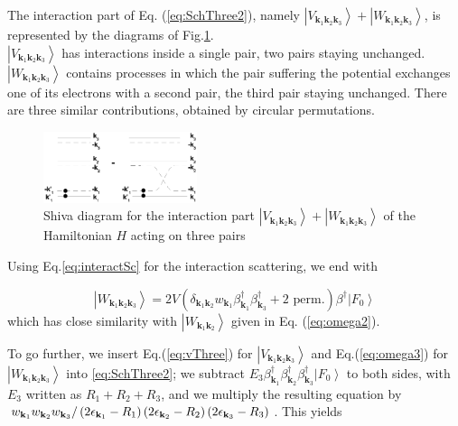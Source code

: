 \documentclass[epj]{svjour}
\begin{document}
The interaction part of Eq. (\ref{eq:SchThree2}), namely $\left|V_{\mathbf{k} _1\mathbf{k} _2%
\mathbf{k} _3}\right>+\left|W_{\mathbf{k} _1\mathbf{k} _2\mathbf{k} _3}\right> $, is represented by the diagrams of Fig.\ref{fig:threeP}. \\$\left|V_{\mathbf{k} _1\mathbf{k} _2
\mathbf{k} _3}\right>$ has interactions inside a single pair, two pairs
staying unchanged. $\left|W_{\mathbf{k} _1\mathbf{k} _2\mathbf{k} _3}\right> $ contains processes in which the pair suffering the potential exchanges one of its electrons with a second pair, the third pair staying unchanged.  There  are three similar  contributions, obtained by circular permutations.
\begin{figure}[htb]
   \includegraphics[width=0.4\textwidth]{threePair.eps}
\caption{Shiva diagram for the interaction part $\left|V_{\mathbf{k} _1\mathbf{k} _2
\mathbf{k} _3}\right> +\left|W_{\mathbf{k} _1\mathbf{k} _2
\mathbf{k} _3}\right>$ of the Hamiltonian $H$ acting on three pairs }\label{fig:threeP}
 \end{figure}

Using Eq.\eqref{eq:interactSc} for the interaction scattering, we end with

\begin{equation}\label{eq:omega3}
\left|W_{\mathbf{k} _1\mathbf{k} _2\mathbf{k} _3}\right>= 2V(\delta_{\mathbf{k} _1\mathbf{k} _2}w_{\mathbf{k} _1}\beta^{\dagger}_{\mathbf{k} _1}\beta^{\dagger}_{\mathbf{k} _3}+ \text{2 perm.})\beta^{\dagger}\left|F_0\right>
\end{equation}
which has close similarity with  $\left|W_{\mathbf{k} _1\mathbf{k} _2}\right> $ given in Eq. (\ref{eq:omega2}). 



To go further, we insert Eq.(\ref{eq:vThree}) for $\left|V_{\mathbf{k} _1\mathbf{k} _2\mathbf{k} _3}\right>$  and Eq.(\ref{eq:omega3}) for $\left|W_{\mathbf{k} _1\mathbf{k} _2\mathbf{k} _3}\right> $ into \eqref{eq:SchThree2}; we subtract $E
_3\beta^{\dagger}_{\mathbf{k} _1}\beta^{\dagger}_{\mathbf{k}
_2}\beta^{\dagger}_{\mathbf{k} _3}\left|F_0\right>  $ to both sides, with $%
E _3$ written as $R_1+R_2+R_3$, and we multiply the resulting equation
by \\$w_{\mathbf{k} _1}w_{\mathbf{k} _2}w_{\mathbf{k} _3}/\left(2\epsilon_{%
\mathbf{k} _1}-R_1\right) \left(2\epsilon_{\mathbf{k} _2}-R_2\right)
\left(2\epsilon_{\mathbf{k} _3}-R_3\right) $. This yields
\end{document}
